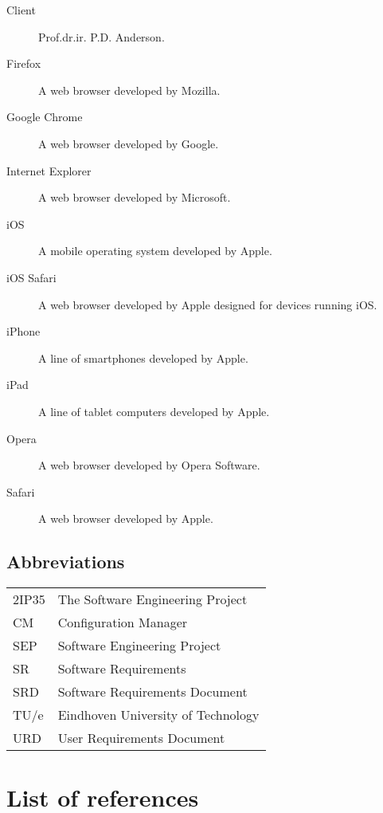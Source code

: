 \begin{description}
\item[Client] Prof.dr.ir. P.D. Anderson.
\item[Firefox] A web browser developed by Mozilla.
\item[Google Chrome] A web browser developed by Google.
\item[Internet Explorer] A web browser developed by Microsoft.
\item[iOS] A mobile operating system developed by Apple.
\item[iOS Safari] A web browser developed by Apple designed for devices running iOS.
\item[iPhone] A line of smartphones developed by Apple.
\item[iPad] A line of tablet computers developed by Apple.
\item[Opera] A web browser developed by Opera Software.
\item[Safari] A web browser developed by Apple.
\end{description}

\subsection{Abbreviations}
\begin{tabular}{l|l}
2IP35 & The Software Engineering Project \\
CM    & Configuration Manager \\
SEP   & Software Engineering Project \\
SR    & Software Requirements \\
SRD   & Software Requirements Document \\
TU/e  & Eindhoven University of Technology \\
URD   & User Requirements Document \\
\end{tabular}

\section{List of references}


